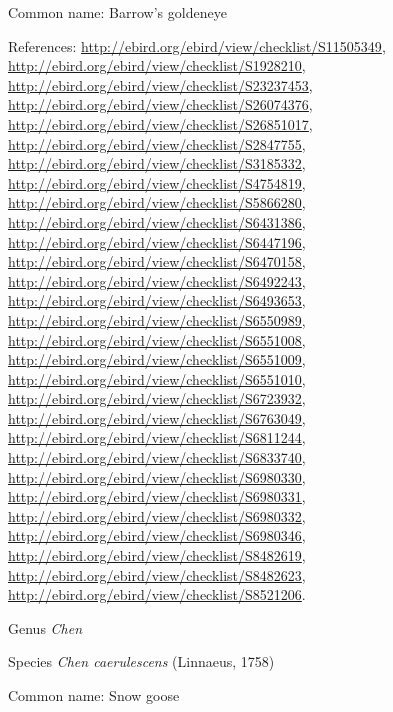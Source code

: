 \documentclass[9pt, article]{memoir}
\begin{document}
\begin{multicols}{2}
Common name: Barrow's goldeneye

References: 
\url{http://ebird.org/ebird/view/checklist/S11505349}, 
\url{http://ebird.org/ebird/view/checklist/S1928210}, 
\url{http://ebird.org/ebird/view/checklist/S23237453}, 
\url{http://ebird.org/ebird/view/checklist/S26074376}, 
\url{http://ebird.org/ebird/view/checklist/S26851017}, 
\url{http://ebird.org/ebird/view/checklist/S2847755}, 
\url{http://ebird.org/ebird/view/checklist/S3185332}, 
\url{http://ebird.org/ebird/view/checklist/S4754819}, 
\url{http://ebird.org/ebird/view/checklist/S5866280}, 
\url{http://ebird.org/ebird/view/checklist/S6431386}, 
\url{http://ebird.org/ebird/view/checklist/S6447196}, 
\url{http://ebird.org/ebird/view/checklist/S6470158}, 
\url{http://ebird.org/ebird/view/checklist/S6492243}, 
\url{http://ebird.org/ebird/view/checklist/S6493653}, 
\url{http://ebird.org/ebird/view/checklist/S6550989}, 
\url{http://ebird.org/ebird/view/checklist/S6551008}, 
\url{http://ebird.org/ebird/view/checklist/S6551009}, 
\url{http://ebird.org/ebird/view/checklist/S6551010}, 
\url{http://ebird.org/ebird/view/checklist/S6723932}, 
\url{http://ebird.org/ebird/view/checklist/S6763049}, 
\url{http://ebird.org/ebird/view/checklist/S6811244}, 
\url{http://ebird.org/ebird/view/checklist/S6833740}, 
\url{http://ebird.org/ebird/view/checklist/S6980330}, 
\url{http://ebird.org/ebird/view/checklist/S6980331}, 
\url{http://ebird.org/ebird/view/checklist/S6980332}, 
\url{http://ebird.org/ebird/view/checklist/S6980346}, 
\url{http://ebird.org/ebird/view/checklist/S8482619}, 
\url{http://ebird.org/ebird/view/checklist/S8482623}, 
\url{http://ebird.org/ebird/view/checklist/S8521206}.

\vspace{6pt}\noindent\hspace{30pt}Genus \textit{Chen}


\vspace{6pt}\noindent\hspace{36pt}Species \textit{Chen caerulescens} (Linnaeus, 1758)


Common name: Snow goose


\end{multicols}
\end{document}
